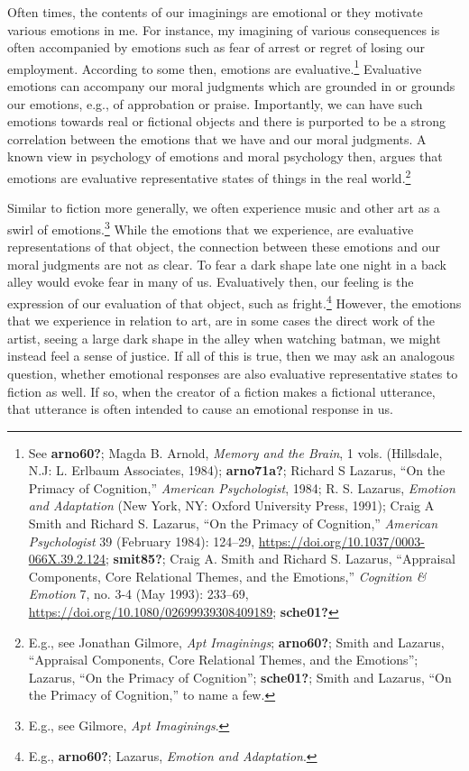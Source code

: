 \documentclass[
  12pt,
]{book}
\theoremstyle{definition}
\theoremstyle{definition}
\theoremstyle{definition}
\theoremstyle{definition}
\theoremstyle{remark}
\begin{document}
Often times, the contents of our imaginings are emotional or they motivate various emotions in me. For instance, my imagining of various consequences is often accompanied by emotions such as fear of arrest or regret of losing our employment. According to some then, emotions are evaluative.\footnote{See \textbf{arno60?}; Magda B. Arnold, \emph{Memory and the Brain}, 1 vols. (Hillsdale, N.J: L. Erlbaum Associates, 1984); \textbf{arno71a?}; Richard S Lazarus, {``On the {Primacy} of {Cognition},''} \emph{American Psychologist}, 1984; R. S. Lazarus, \emph{Emotion and Adaptation} (New York, NY: Oxford University Press, 1991); Craig A Smith and Richard S. Lazarus, {``On the {Primacy} of {Cognition},''} \emph{American Psychologist} 39 (February 1984): 124--29, \url{https://doi.org/10.1037/0003-066X.39.2.124}; \textbf{smit85?}; Craig A. Smith and Richard S. Lazarus, {``Appraisal {Components}, {Core Relational Themes}, and the {Emotions},''} \emph{Cognition \& Emotion} 7, no. 3-4 (May 1993): 233--69, \url{https://doi.org/10.1080/02699939308409189}; \textbf{sche01?}} Evaluative emotions can accompany our moral judgments which are grounded in or grounds our emotions, e.g., of approbation or praise. Importantly, we can have such emotions towards real or fictional objects and there is purported to be a strong correlation between the emotions that we have and our moral judgments. A known view in psychology of emotions and moral psychology then, argues that emotions are evaluative representative states of things in the real world.\footnote{E.g., see Jonathan Gilmore, \emph{Apt {Imaginings}}; \textbf{arno60?}; Smith and Lazarus, {``Appraisal {Components}, {Core Relational Themes}, and the {Emotions}''}; Lazarus, {``On the {Primacy} of {Cognition}''}; \textbf{sche01?}; Smith and Lazarus, {``On the {Primacy} of {Cognition},''} to name a few.}

Similar to fiction more generally, we often experience music and other art as a swirl of emotions.\footnote{E.g., see Gilmore, \emph{Apt {Imaginings}}.} While the emotions that we experience, are evaluative representations of that object, the connection between these emotions and our moral judgments are not as clear. To fear a dark shape late one night in a back alley would evoke fear in many of us. Evaluatively then, our feeling is the expression of our evaluation of that object, such as fright.\footnote{E.g., \textbf{arno60?}; Lazarus, \emph{Emotion and Adaptation}.} However, the emotions that we experience in relation to art, are in some cases the direct work of the artist, seeing a large dark shape in the alley when watching batman, we might instead feel a sense of justice. If all of this is true, then we may ask an analogous question, whether emotional responses are also evaluative representative states to fiction as well. If so, when the creator of a fiction makes a fictional utterance, that utterance is often intended to cause an emotional response in us.
\end{document}
